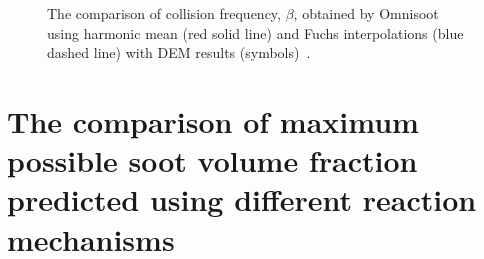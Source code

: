 \begin{figure}[H]
	\centering
	\caption{The comparison of collision frequency, $\beta$, obtained by Omnisoot using harmonic mean (red solid line) and Fuchs interpolations (blue dashed line) with DEM results (symbols)~\citep{goudeli2015coagulation}.}
	\label{fig:kernelvalid} 
\end{figure}


%

\section{The comparison of maximum possible soot volume fraction predicted using different reaction mechanisms}

